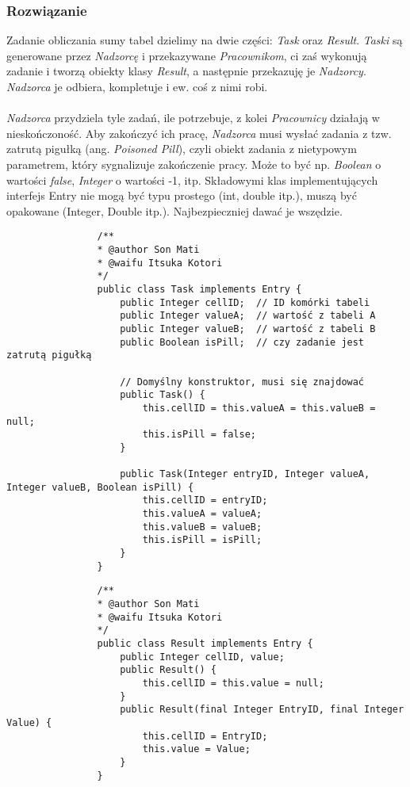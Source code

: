 		\subsubsection{Rozwiązanie}
			Zadanie obliczania sumy tabel dzielimy na dwie części: \textit{Task} oraz \textit{Result}. \textit{Taski} są generowane przez \textit{Nadzorcę} i przekazywane \textit{Pracownikom}, ci zaś wykonują zadanie i tworzą obiekty klasy \textit{Result}, a następnie przekazuję je \textit{Nadzorcy}. \textit{Nadzorca} je odbiera, kompletuje i ew. coś z nimi robi.\\\\
			\textit{Nadzorca} przydziela tyle zadań, ile potrzebuje, z kolei \textit{Pracownicy} działają w nieskończoność. Aby zakończyć ich pracę, \textit{Nadzorca} musi wysłać zadania z tzw. zatrutą pigułką (ang. \emph{Poisoned Pill}), czyli obiekt zadania z nietypowym parametrem, który sygnalizuje zakończenie pracy. Może to być np. \textit{Boolean} o wartości \textit{false}, \textit{Integer} o wartości -1, itp.
			Składowymi klas implementujących interfejs Entry nie mogą być typu prostego (int, double itp.), muszą być opakowane (Integer, Double itp.). Najbezpieczniej dawać je wszędzie.\\
			\begin{lstlisting}
				/**
				* @author Son Mati
				* @waifu Itsuka Kotori
				*/
				public class Task implements Entry {
					public Integer cellID;	// ID komórki tabeli
					public Integer valueA;	// wartość z tabeli A
					public Integer valueB;	// wartość z tabeli B
					public Boolean isPill;	// czy zadanie jest zatrutą pigułką

					// Domyślny konstruktor, musi się znajdować
					public Task() {
						this.cellID = this.valueA = this.valueB = null;
						this.isPill = false;
					}
					
					public Task(Integer entryID, Integer valueA, Integer valueB, Boolean isPill) {
						this.cellID = entryID;
						this.valueA = valueA;
						this.valueB = valueB;
						this.isPill = isPill;
					}
				}
			\end{lstlisting}
			\newpage
			\begin{lstlisting}
				/**
				* @author Son Mati
				* @waifu Itsuka Kotori
				*/
				public class Result implements Entry {
					public Integer cellID, value;
					public Result() {
						this.cellID = this.value = null;
					}
					public Result(final Integer EntryID, final Integer Value) {
						this.cellID = EntryID;
						this.value = Value;
					}
				}
			\end{lstlisting}
